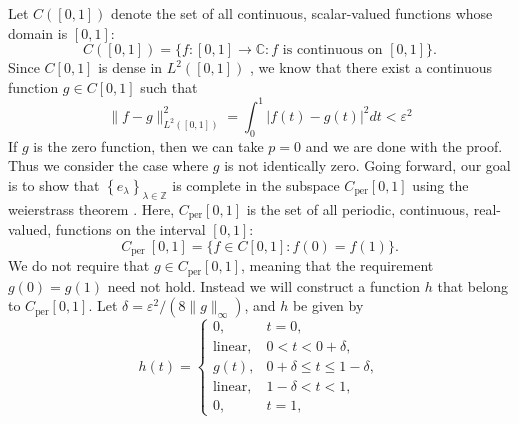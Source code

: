 \documentclass[../thesis.tex]{subfiles}
\begin{document}
Let $C([0,1])$ denote the set of all continuous, scalar-valued functions whose domain is $[0,1]$:
\begin{equation}
    C([0,1])=\{f:[0,1] \rightarrow \mathbb{C}: f \text{ is continuous on } [0,1]\}.
\end{equation}
Since $C[0,1]$ is dense in $L^2([0,1])$ \cite{heilMetricsNormsInner2018}, we know that there exist a continuous function $g \in C[0,1]$ such that %
\begin{equation}
    \| f-g \|_{L^2([0,1])}^2 = \int_0^1 \left|f(t)-g(t) \right|^2dt < \varepsilon^2
\end{equation}
If $g$ is the zero function, then we can take $p=0$ and we are done with the proof. Thus we consider the case where $g$ is not identically zero. Going forward, our goal is to show that $\left\{ e_{\lambda} \right\}_{\lambda\in \mathbb{Z}}$ is complete in the subspace $C_{\text{per}}[0,1]$ using the weierstrass theorem \cite{durenInvitationClassicalAnalysis2012}. Here, $C_{\text{per}}[0,1]$ is the set of all periodic, continuous, real-valued, functions on the interval $[0,1]$:
\begin{equation*}
C_{\text {per }}[0,1]=\{f \in C[0,1]: f(0)=f(1)\}.
\end{equation*}
We do not require that $g \in C_{\text{per}}[0,1]$, meaning that the requirement $g(0)=g(1)$ need not hold. Instead we will construct a function $h$ that belong to $C_{\text{per}}[0,1]$. Let  $\delta = \varepsilon^2/(8\|g\|_\infty)$, and $h$  be given by %
\begin{equation*}
    h(t) = 
    \begin{cases} 0, &  t=0,\\  
        \text{linear}, &  0<t<0+\delta,\\ 
        g(t), & 0+\delta \leq t \leq 1-\delta,\\ 
        \text{linear}, &  1-\delta <t<1,\\ 
        0, &  t=1,
    \end{cases}
\end{equation*}
\end{document}
